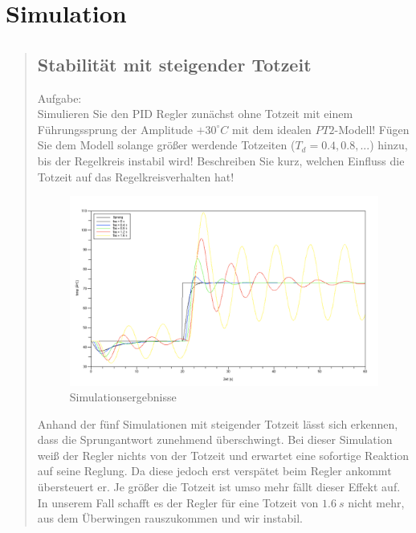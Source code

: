 \section{Simulation}
\begin{quote}
    
    
    
    \subsection{Stabilität mit steigender Totzeit}
    \begin{quote}
        
    \end{quote}
    Aufgabe:\\
    Simulieren Sie den PID Regler zunächst ohne Totzeit mit einem Führungssprung der Amplitude $+30^{\circ}C$ mit dem
    idealen $PT2$-Modell! Fügen Sie dem Modell solange größer werdende Totzeiten ($T_d = 0.4, 0.8, . . .$) hinzu, bis
    der Regelkreis instabil wird! Beschreiben Sie kurz, welchen Einfluss die Totzeit auf das Regelkreisverhalten
    hat!\vspace{1em}
            
        \begin{figure}[H]
        \centering
            \includegraphics[scale=0.4, trim = 0cm 0cm 0cm 0cm, clip]{./Bilder/4_1_Simulation}
                \caption{Simulationsergebnisse}
        \end{figure}
        
        Anhand der fünf Simulationen mit steigender Totzeit lässt sich erkennen, dass die Sprungantwort zunehmend
        überschwingt. Bei dieser Simulation weiß der Regler nichts von der Totzeit und erwartet eine sofortige
        Reaktion auf seine Reglung. Da diese jedoch erst verspätet beim Regler ankommt übersteuert er. Je größer die
        Totzeit ist umso mehr fällt dieser Effekt auf. In unserem Fall schafft es der Regler für eine Totzeit von $1.6
        \ s$ nicht mehr, aus dem Überwingen rauszukommen und wir instabil.\\
        \vspace{1em}
    
    \end{quote}
    
